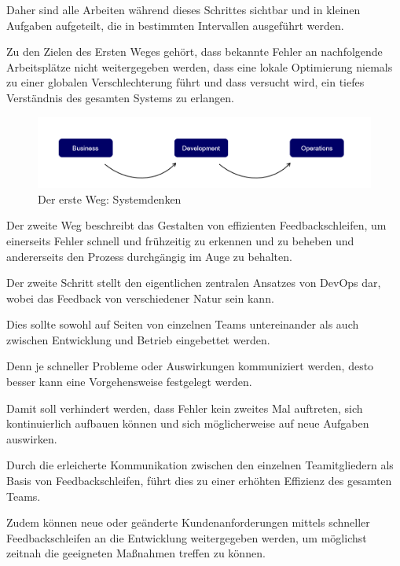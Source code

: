 Daher sind alle Arbeiten während dieses Schrittes sichtbar und in kleinen Aufgaben aufgeteilt, die in bestimmten Intervallen ausgeführt werden. 

Zu den Zielen des Ersten Weges gehört, dass bekannte Fehler an nachfolgende Arbeitsplätze nicht weitergegeben werden, dass eine lokale Optimierung niemals zu einer globalen Verschlechterung führt und dass versucht wird, ein tiefes Verständnis des gesamten Systems zu erlangen. \cite{kim_three_2012}  

\begin{figure}[h]
    \centering
    \includegraphics[scale=0.6]{Bilder/First Way.png}
    \caption{Der erste Weg: Systemdenken \cite{kim_three_2012}}
\end{figure}

Der zweite Weg beschreibt das Gestalten von effizienten Feedbackschleifen, um einerseits Fehler schnell und frühzeitig zu erkennen und zu beheben und andererseits den Prozess durchgängig im Auge zu behalten.

Der zweite Schritt stellt den eigentlichen zentralen Ansatzes von DevOps dar, wobei das Feedback von verschiedener Natur sein kann. \cite[S. 254]{tiemeyer_handbuch_2021} 

Dies sollte sowohl auf Seiten von einzelnen Teams untereinander als auch zwischen Entwicklung und Betrieb eingebettet werden. \cite[S. 94]{ravichandran_devops_2016}

Denn je schneller Probleme oder Auswirkungen kommuniziert werden, desto besser kann eine Vorgehensweise festgelegt werden. 

Damit soll verhindert werden, dass Fehler kein zweites Mal auftreten, sich kontinuierlich aufbauen können und sich möglicherweise auf neue Aufgaben auswirken. 

Durch die erleicherte Kommunikation zwischen den einzelnen Teamitgliedern als Basis von Feedbackschleifen, führt dies zu einer erhöhten Effizienz des gesamten Teams. 

Zudem können neue oder geänderte Kundenanforderungen mittels schneller Feedbackschleifen an die Entwicklung weitergegeben werden, um möglichst zeitnah die geeigneten Maßnahmen treffen zu können.

